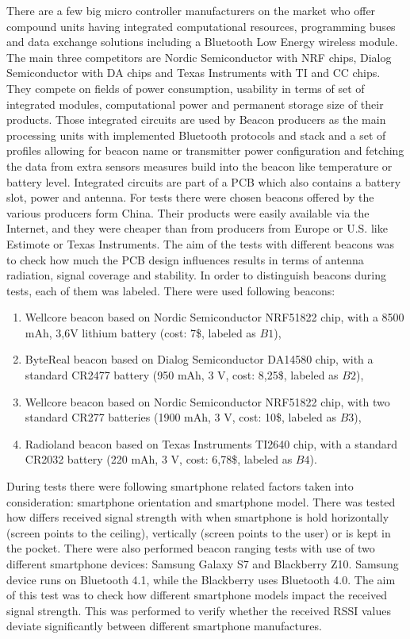 \documentclass[../main.tex]{subfiles}
\begin{document}
There are a few big micro controller manufacturers on the market who offer compound units having integrated computational resources, programming buses and data exchange solutions including a Bluetooth Low Energy wireless module\cite{beacons_ble_evaluation}. The main three competitors are Nordic Semiconductor with NRF chips, Dialog Semiconductor with DA chips and Texas Instruments with TI and CC chips. They compete on fields of power consumption, usability in terms of set of integrated modules, computational power and permanent storage size of their products. Those integrated circuits are used by Beacon producers as the main processing units with implemented Bluetooth protocols and stack and a set of profiles allowing for beacon name or transmitter power configuration and fetching the data from extra sensors measures build into the beacon like temperature or battery level. Integrated circuits are part of a PCB which also contains a battery slot, power and antenna. For tests there were chosen beacons offered by the various producers form China. Their products were easily available via the Internet, and they were cheaper than from producers from Europe or U.S. like Estimote or Texas Instruments\cite{beacons_ble_evaluation}. The aim of the tests with different beacons was to check how much the PCB design influences results in terms of antenna radiation, signal coverage and stability. In order to distinguish beacons during tests, each of them was labeled. There were used following beacons:
\begin{enumerate}
	\item Wellcore beacon based on Nordic Semiconductor NRF51822 chip, with a 8500 mAh, 3,6V lithium battery (cost: 7\$, labeled as $B1$),
	\item ByteReal beacon based on Dialog Semiconductor DA14580 chip, with a standard CR2477 battery (950 mAh, 3 V, cost: 8,25\$, labeled as $B2$),
	\item Wellcore beacon based on Nordic Semiconductor NRF51822 chip, with two standard CR277 batteries (1900 mAh, 3 V, cost: 10\$, labeled as $B3$),
	\item Radioland beacon based on Texas Instruments TI2640 chip, with a standard CR2032 battery (220 mAh, 3 V, cost: 6,78\$, labeled as $B4$).
\end{enumerate}

During tests there were following smartphone related factors taken into consideration: smartphone orientation and smartphone model. There was tested how differs received signal strength with when smartphone is hold horizontally (screen points to the ceiling), vertically (screen points to the user) or is kept in the pocket. There were also performed beacon ranging tests with use of two different smartphone devices: Samsung Galaxy S7 and Blackberry Z10. Samsung device runs on Bluetooth 4.1, while the Blackberry uses Bluetooth 4.0. The aim of this test was to check how different smartphone models impact the received signal strength. This was performed to verify whether the received RSSI values deviate significantly between different smartphone manufactures.
\end{document}
